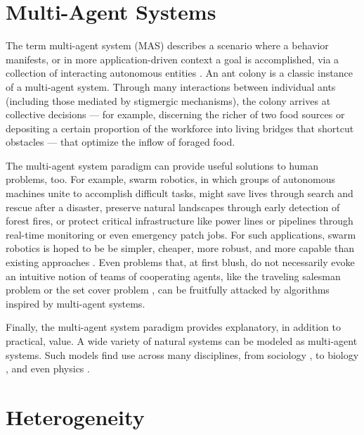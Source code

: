 \section{Multi-Agent Systems}

The term multi-agent system (MAS) describes a scenario where a behavior manifests, or in more application-driven context a goal is accomplished, via a collection of interacting autonomous entities \cite{ferber2003agents}.
An ant colony is a classic instance of a multi-agent system.
Through many interactions between individual ants (including those mediated by stigmergic mechanisms), the colony arrives at collective decisions --- for example, discerning the richer of two food sources \cite{beckers1993modulation} or depositing a certain proportion of the workforce into living bridges that shortcut obstacles \cite{graham2017optimal} --- that optimize the inflow of foraged food.

The multi-agent system paradigm can provide useful solutions to human problems, too.
For example, swarm robotics, in which groups of autonomous machines unite to accomplish difficult tasks, might save lives through search and rescue after a disaster, preserve natural landscapes through early detection of forest fires, or protect critical infrastructure like power lines or pipelines through real-time monitoring or even emergency patch jobs.
For such applications, swarm robotics is hoped to be be simpler, cheaper, more robust, and more capable than existing approaches \cite{tan2013research}.
Even problems that, at first blush, do not necessarily evoke an intuitive notion of teams of cooperating agents, like the traveling salesman problem \cite{dorigo1997ant, bnasin2013applications} or the set cover problem \cite{rahoual2002parallel,ren2010new}, can be fruitfully attacked by algorithms inspired by multi-agent systems.

Finally, the multi-agent system paradigm provides explanatory, in addition to practical, value.
A wide variety of natural systems can be modeled as multi-agent systems.
Such models find use across many disciplines, from sociology \cite{sawyer2003artificial}, to biology \cite{perna2012individual, amigoni2007multiagent}, and even physics \cite{vicsek1995novel}.

\section{Heterogeneity}

